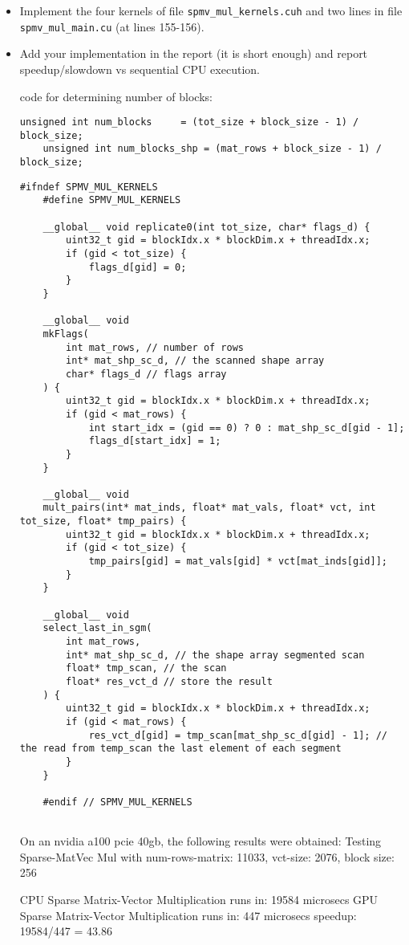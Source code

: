 \documentclass{article}
\begin{document}
\begin{itemize}
  \item Implement the four kernels of file \texttt{spmv\_mul\_kernels.cuh} and two lines in file \texttt{spmv\_mul\_main.cu} (at lines 155-156).
  \item Add your implementation in the report (it is short enough) and report speedup/slowdown vs sequential CPU execution.
  
  code for determining number of blocks:
  
  \begin{lstlisting}[language=cuda]
    unsigned int num_blocks     = (tot_size + block_size - 1) / block_size;
    unsigned int num_blocks_shp = (mat_rows + block_size - 1) / block_size;  
  \end{lstlisting}

  \begin{lstlisting}[language=cuda]
    #ifndef SPMV_MUL_KERNELS
    #define SPMV_MUL_KERNELS

    __global__ void replicate0(int tot_size, char* flags_d) {
        uint32_t gid = blockIdx.x * blockDim.x + threadIdx.x;
        if (gid < tot_size) {
            flags_d[gid] = 0;
        }
    }

    __global__ void
    mkFlags(
        int mat_rows, // number of rows 
        int* mat_shp_sc_d, // the scanned shape array
        char* flags_d // flags array
    ) {
        uint32_t gid = blockIdx.x * blockDim.x + threadIdx.x;
        if (gid < mat_rows) {
            int start_idx = (gid == 0) ? 0 : mat_shp_sc_d[gid - 1];
            flags_d[start_idx] = 1;
        }
    }

    __global__ void
    mult_pairs(int* mat_inds, float* mat_vals, float* vct, int tot_size, float* tmp_pairs) {
        uint32_t gid = blockIdx.x * blockDim.x + threadIdx.x;
        if (gid < tot_size) {
            tmp_pairs[gid] = mat_vals[gid] * vct[mat_inds[gid]];
        }
    }

    __global__ void
    select_last_in_sgm(
        int mat_rows, 
        int* mat_shp_sc_d, // the shape array segmented scan
        float* tmp_scan, // the scan
        float* res_vct_d // store the result
    ) {
        uint32_t gid = blockIdx.x * blockDim.x + threadIdx.x;
        if (gid < mat_rows) {
            res_vct_d[gid] = tmp_scan[mat_shp_sc_d[gid] - 1]; // the read from temp_scan the last element of each segment
        }
    }

    #endif // SPMV_MUL_KERNELS


  \end{lstlisting}

  On an nvidia a100 pcie 40gb, the following results were obtained:
  Testing Sparse-MatVec Mul with num-rows-matrix: 11033, vct-size: 2076, block size: 256

  CPU Sparse Matrix-Vector Multiplication runs in: 19584 microsecs
  GPU Sparse Matrix-Vector Multiplication runs in: 447 microsecs
  speedup: 19584/447 = 43.86
\end{itemize}
\end{document}
